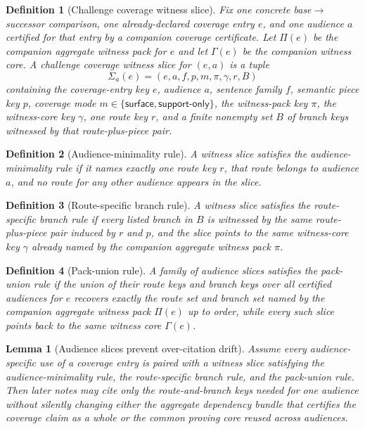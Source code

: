 \documentclass[11pt]{article}
\newtheorem{definition}{Definition}
\newtheorem{lemma}{Lemma}
\begin{document}
\begin{definition}[Challenge coverage witness slice]
Fix one concrete base$\to$successor comparison, one already-declared coverage entry $e$, and one audience $a$ certified for that entry by a companion coverage certificate.
Let $\Pi(e)$ be the companion aggregate witness pack for $e$ and let $\Gamma(e)$ be the companion witness core.
A \emph{challenge coverage witness slice} for $(e,a)$ is a tuple
\[
\Sigma_a(e)=(e,a,f,p,m,\pi,\gamma,r,B)
\]
containing the coverage-entry key $e$, audience $a$, sentence family $f$, semantic piece key $p$, coverage mode $m\in\{\textsf{surface},\textsf{support-only}\}$, the witness-pack key $\pi$, the witness-core key $\gamma$, one route key $r$, and a finite nonempty set $B$ of branch keys witnessed by that route-plus-piece pair.
\end{definition}

\begin{definition}[Audience-minimality rule]
A witness slice satisfies the \emph{audience-minimality rule} if it names exactly one route key $r$, that route belongs to audience $a$, and no route for any other audience appears in the slice.
\end{definition}

\begin{definition}[Route-specific branch rule]
A witness slice satisfies the \emph{route-specific branch rule} if every listed branch in $B$ is witnessed by the same route-plus-piece pair induced by $r$ and $p$, and the slice points to the same witness-core key $\gamma$ already named by the companion aggregate witness pack $\pi$.
\end{definition}

\begin{definition}[Pack-union rule]
A family of audience slices satisfies the \emph{pack-union rule} if the union of their route keys and branch keys over all certified audiences for $e$ recovers exactly the route set and branch set named by the companion aggregate witness pack $\Pi(e)$ up to order, while every such slice points back to the same witness core $\Gamma(e)$.
\end{definition}

\begin{lemma}[Audience slices prevent over-citation drift]
Assume every audience-specific use of a coverage entry is paired with a witness slice satisfying the audience-minimality rule, the route-specific branch rule, and the pack-union rule.
Then later notes may cite only the route-and-branch keys needed for one audience without silently changing either the aggregate dependency bundle that certifies the coverage claim as a whole or the common proving core reused across audiences.
\end{lemma}
\end{document}
